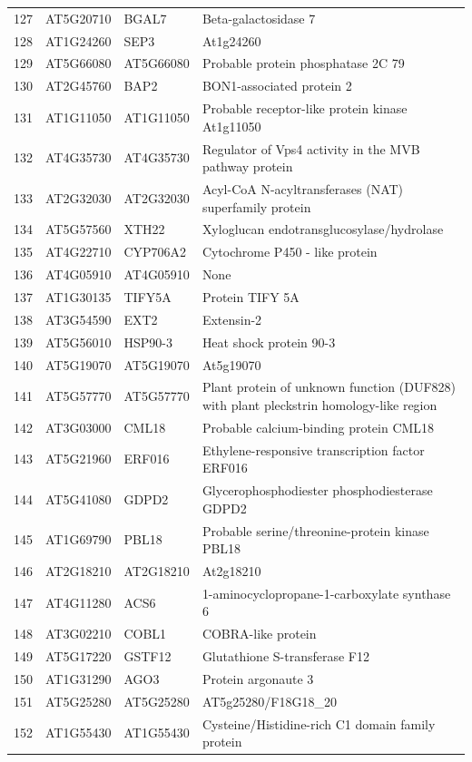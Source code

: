 \documentclass[11pt]{article}
\begin{document}
\begin{center}
\begin{tabular}{rlll}
127 & AT5G20710 & BGAL7 & Beta-galactosidase 7\\
128 & AT1G24260 & SEP3 & At1g24260\\
129 & AT5G66080 & AT5G66080 & Probable protein phosphatase 2C 79\\
130 & AT2G45760 & BAP2 & BON1-associated protein 2\\
131 & AT1G11050 & AT1G11050 & Probable receptor-like protein kinase At1g11050\\
132 & AT4G35730 & AT4G35730 & Regulator of Vps4 activity in the MVB pathway protein\\
133 & AT2G32030 & AT2G32030 & Acyl-CoA N-acyltransferases (NAT) superfamily protein\\
134 & AT5G57560 & XTH22 & Xyloglucan endotransglucosylase/hydrolase\\
135 & AT4G22710 & CYP706A2 & Cytochrome P450 - like protein\\
136 & AT4G05910 & AT4G05910 & None\\
137 & AT1G30135 & TIFY5A & Protein TIFY 5A\\
138 & AT3G54590 & EXT2 & Extensin-2\\
139 & AT5G56010 & HSP90-3 & Heat shock protein 90-3\\
140 & AT5G19070 & AT5G19070 & At5g19070\\
141 & AT5G57770 & AT5G57770 & Plant protein of unknown function (DUF828) with plant pleckstrin homology-like region\\
142 & AT3G03000 & CML18 & Probable calcium-binding protein CML18\\
143 & AT5G21960 & ERF016 & Ethylene-responsive transcription factor ERF016\\
144 & AT5G41080 & GDPD2 & Glycerophosphodiester phosphodiesterase GDPD2\\
145 & AT1G69790 & PBL18 & Probable serine/threonine-protein kinase PBL18\\
146 & AT2G18210 & AT2G18210 & At2g18210\\
147 & AT4G11280 & ACS6 & 1-aminocyclopropane-1-carboxylate synthase 6\\
148 & AT3G02210 & COBL1 & COBRA-like protein\\
149 & AT5G17220 & GSTF12 & Glutathione S-transferase F12\\
150 & AT1G31290 & AGO3 & Protein argonaute 3\\
151 & AT5G25280 & AT5G25280 & AT5g25280/F18G18\_20\\
152 & AT1G55430 & AT1G55430 & Cysteine/Histidine-rich C1 domain family protein\\

\end{tabular}
\end{center}
\end{document}
